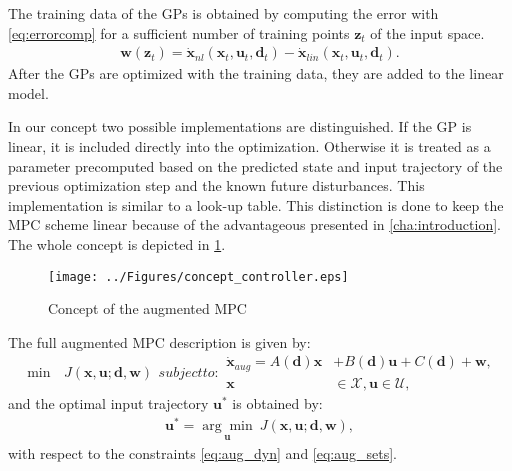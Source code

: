 The training data of the GPs is obtained by computing the error with \ref{eq:errorcomp} for a sufficient number of training points $\mathbf{z}_t$ of the input space.
\begin{align}
\mathbf{w} \left( \mathbf{z}_t \right) = \dot{\mathbf{x}}_{nl} \left( \mathbf{x}_t,\mathbf{u}_t,\mathbf{d}_t \right) - \dot{\mathbf{x}}_{lin} \left( \mathbf{x}_t,\mathbf{u}_t,\mathbf{d}_t \right). \label{eq:errorcomp}
\end{align}
After the GPs are optimized with the training data, they are added to the linear model.

In our concept two possible implementations are distinguished.
If the GP is linear, it is included directly into the optimization.
Otherwise it is treated as a parameter precomputed based on the predicted state and input trajectory of the previous optimization step and the known future disturbances.
This implementation is similar to a look-up table.
This distinction is done to keep the MPC scheme linear because of the advantageous presented in \cref{cha:introduction}.
The whole concept is depicted in \cref{fig:concept_controller}.

\begin{figure}[t]
\begin{center}
	\texttt{[image: ../Figures/concept\_controller.eps]}
	\caption{Concept of the augmented MPC}
	\label{fig:concept_controller}
\end{center}
\end{figure}

The full augmented MPC description is given by:
\begin{subequations}\label{eq:description_aug}
\begin{align}
\min \, &J(\mathbf{x},\mathbf{u};\mathbf{d},\mathbf{w})
\end{align}
subject to:
\begin{align}
\dot{\mathbf{x}}_{aug} = A \left( \mathbf{d} \right) \mathbf{x} &+ B \left( \mathbf{d} \right) \mathbf{u} + C \left( \mathbf{d} \right) + \mathbf{w},\label{eq:aug_dyn}\\
\mathbf{x} &\in \mathcal{X}, \mathbf{u} \in \mathcal{U},\label{eq:aug_sets}
\end{align}
\end{subequations}
and the optimal input trajectory $\mathbf{u}^*$ is obtained by:
\begin{align}
\mathbf{u}^* = \underset{\mathbf{u}}{\arg\min}~J(\mathbf{x},\mathbf{u};\mathbf{d},\mathbf{w}), \label{eq:uoptaug}
\end{align}
with respect to the constraints \eqref{eq:aug_dyn} and \eqref{eq:aug_sets}.

